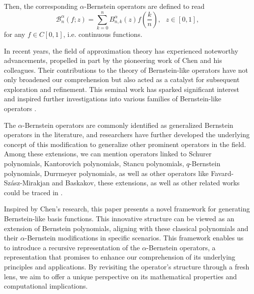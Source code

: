 \documentclass[preprint,12pt]{elsarticle}
\theoremstyle{definition}
\theoremstyle{theorem}
\theoremstyle{lemma}
\theoremstyle{example}
\theoremstyle{remark}
\theoremstyle{prop}
\begin{document}
Then, the corresponding $ \alpha $-Bernstein operators are defined to read
\[ \mathcal{B}_n^{\alpha}(f;z) =\sum_{k=0}^n B_{n,k}^{\alpha}(z)f(\frac{k}{n}),  ~~~ z\in [0,1],\] 
for any $f \in  C[0,1]$, i.e. continuous functions.

In recent years, the field of approximation theory has experienced noteworthy advancements, propelled in part by the pioneering work of Chen and his colleagues. Their contributions to the theory of Bernstein-like operators have not only broadened our comprehension but also acted as a catalyst for subsequent exploration and refinement. This seminal work has sparked significant interest and inspired further investigations into various families of Bernstein-like operators \cite{mohiuddine2017construction, kajla2018blending, mohiuddine2020approximation, ozger2020approximation}.




The $\alpha$-Bernstein operators are commonly identified as generalized Bernstein operators in the literature, and researchers have further developed the underlying concept of this modification to generalize other prominent operators in the field.
Among these extensions, we can mention operators linked to Schurer polynomials, Kantorovich polynomials, Stancu polynomials, $q$-Bernstein polynomials, Durrmeyer polynomials, as well as other operators like Favard-Szász-Mirakjan and Baskakov, these  extensions, as well as other related works could be traced in \cite{    mohiuddine2017construction, ozger2020approximation,  mohiuddine2021approximation, aral2019parametric, cheng2023construction, kajla2019generalized}.


Inspired by Chen's research, this paper presents a novel framework for generating Bernstein-like basis functions. This innovative structure can be viewed as an extension of Bernstein polynomials, aligning with these classical polynomials and their $\alpha$-Bernstein modifications  \cite{chen2017approximation} in specific scenarios. This framework enables us to  introduce a recursive  representation of the  $\alpha$-Bernstein operators, a representation that promises to enhance our comprehension of its underlying principles and applications. By revisiting the operator's structure through a fresh lens, we aim to offer a unique perspective on its mathematical properties and computational implications.
\end{document}
